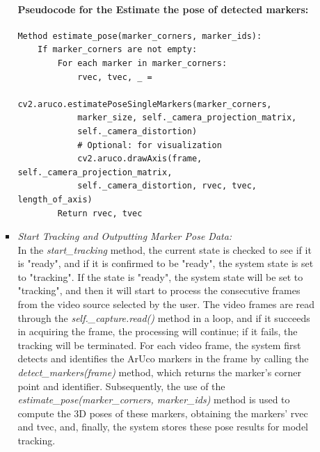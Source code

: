 \documentclass[12pt]{article}
\begin{document}
\begin{enumerate}
\begin{enumerate}
\begin{itemize}
                                    \paragraph{Pseudocode for the Estimate the pose of detected markers:}
                                    \begin{verbatim}
Method estimate_pose(marker_corners, marker_ids):
    If marker_corners are not empty:
        For each marker in marker_corners:
            rvec, tvec, _ = 
            cv2.aruco.estimatePoseSingleMarkers(marker_corners, 
            marker_size, self._camera_projection_matrix, 
            self._camera_distortion)
            # Optional: for visualization
            cv2.aruco.drawAxis(frame, self._camera_projection_matrix, 
            self._camera_distortion, rvec, tvec, length_of_axis)  
        Return rvec, tvec
                              \end{verbatim}
                              \item \textit{Start Tracking and Outputting Marker Pose Data:}
                                    \label{sec:tracking}
                                    \\
                                    In the \emph{start\_tracking} method, the current state is checked to see if it is "ready", and if it is confirmed to be "ready", the system state is set to "tracking". If the state is "ready", the system state will be set to "tracking", and then it will start to process the consecutive frames from the video source selected by the user. The video frames are read through the \emph{self.\_capture.read() }method in a loop, and if it succeeds in acquiring the frame, the processing will continue; if it fails, the tracking will be terminated. For each video frame, the system first detects and identifies the ArUco markers in the frame by calling the \emph{detect\_markers(frame) } method, which returns the marker's corner point and identifier. Subsequently, the use of the \emph{estimate\_pose(marker\_corners, marker\_ids)} method is used to compute the 3D poses of these markers, obtaining the markers' \gls{rvec} and \gls{tvec}, and, finally, the system stores these pose results for model tracking.

\end{itemize}
\end{enumerate}
\end{enumerate}
\end{document}
